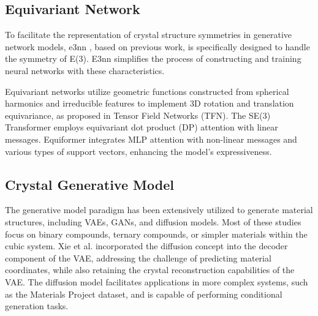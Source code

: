 \subsection{Equivariant Network}
\label{equnet}
To facilitate the representation of crystal structure symmetries in generative network models, e3nn \cite{mario_geiger_2022_6459381}, based on previous work\cite{Thomas2018TensorFN, weiler20183d}, is specifically designed to handle the symmetry of E(3). E3nn simplifies the process of constructing and training neural networks with these characteristics.

Equivariant networks\cite{kondor2018clebsch,unke2021se, tholke2022equivariant, brandstetter2022geometric} utilize geometric functions constructed from spherical harmonics and irreducible features to implement 3D rotation and translation equivariance, as proposed in Tensor Field Networks (TFN)\cite{Thomas2018TensorFN}. The SE(3) Transformer\cite{fuchs2020se} employs equivariant dot product (DP) attention\cite{vaswani2017attention} with linear messages. Equiformer \cite{liao2023equiformer} integrates MLP attention with non-linear messages and various types of support vectors, enhancing the model's expressiveness.

\subsection{Crystal Generative Model}
\label{crygenmodel}
The generative model paradigm has been extensively utilized to generate material structures, including VAEs\cite{oubari:hal-04464893, noh2019inverse, hoffmann2019data, Ren2020InverseDO, court20203, xie2021crystal}, GANs\cite{nouira2018crystalgan, dan2020generative, kim2020generative, long2021constrained}, and diffusion models\cite{jiao2023crystal, yang2024scalable, zeni2025generative}. Most of these studies focus on binary compounds\cite{noh2019inverse, long2021constrained}, ternary compounds\cite{nouira2018crystalgan, kim2020generative}, or simpler materials within the cubic system\cite{hoffmann2019data, court20203}. Xie et al.\cite{xie2021crystal} incorporated the diffusion concept into the decoder component of the VAE, addressing the challenge of predicting material coordinates, while also retaining the crystal reconstruction capabilities of the VAE. The diffusion model\cite{jiao2023crystal, yang2024scalable, zeni2025generative} facilitates applications in more complex systems, such as the Materials Project dataset\cite{jain2013commentary}, and is capable of performing conditional generation tasks.